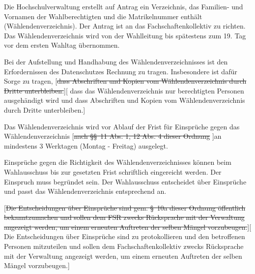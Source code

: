 \documentclass[%
draft,%
multilinesections%
]{fswo}
\newcommand\oldT[1]  {{\color{Gray}[\st{#1}]}}
\newcommand\newT[1]  {{\color{Green}[#1]}}
\newcommand\oldT[1]{}%
\newcommand\newT[1]{#1}
\newcommand\change[2]{\oldT{#1}\newT{#2}}
\begin{document}
\begin{contract}
Die Hochschulverwaltung erstellt auf Antrag ein Verzeichnis, das Familien- und Vornamen der Wahlberechtigten und die Matrikelnummer enthält (Wählendenverzeichnis).
Der Antrag ist an das Fachschaftenkollektiv zu richten.
Das Wählendenverzeichnis wird von der Wahlleitung bis spätestens zum 19. Tag vor dem ersten Wahltag übernommen.

Bei der Aufstellung und Handhabung des Wählendenverzeichnisses ist den Erfordernissen des Datenschutzes Rechnung zu tragen.
Insbesondere ist dafür Sorge zu tragen,
\change{dass Abschriften und Kopien vom Wählendenverzeichnis durch Dritte unterbleiben.}{%
dass das Wählendenverzeichnis nur berechtigten Personen ausgehändigt wird und dass Abschriften und Kopien vom Wählendenverzeichnis durch Dritte unterbleiben.}

Das Wählendenverzeichnis wird vor Ablauf der Frist für Einsprüche gegen das Wählendenverzeichnis \oldT{nach \S\S~11 Abs. 1, 12 Abs. 4 dieser Ordnung }an mindestens 3 Werktagen (Montag - Freitag) ausgelegt.

Einsprüche gegen die Richtigkeit des Wählendenverzeichnisses können beim Wahlausschuss bis zur gesetzten Frist schriftlich eingereicht werden.
Der Einspruch muss begründet sein.
Der Wahlausschuss entscheidet über Einsprüche und passt das Wählendenverzeichnis entsprechend an.

\change{Die Entscheidungen über Einsprüche sind gem. \S~10a dieser Ordnung öffentlich bekanntzumachen und sollen dem FSR zwecks Rücksprache mit der Verwaltung angezeigt werden,
um einem erneuten Auftreten der selben Mängel vorzubeugen.}{%
Die Entscheidungen über Einsprüche sind zu protokollieren und den betroffenen Personen mitzuteilen und sollen dem Fachschaftenkollektiv zwecks Rücksprache mit der Verwaltung angezeigt werden, um einem erneuten Auftreten der selben Mängel vorzubeugen.}
\end{contract}
\end{document}
